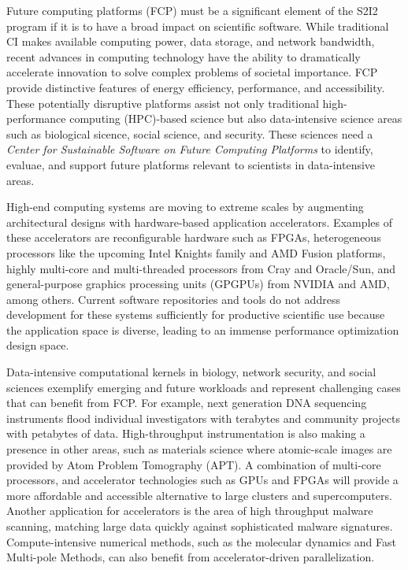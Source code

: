 Future computing platforms (FCP) must be a significant element of the S2I2 program if it is to have a broad impact on scientific software. 
While traditional CI makes available computing power, data storage, and network bandwidth, recent advances in computing technology have the ability to dramatically accelerate innovation to solve complex problems of societal importance. 
FCP provide distinctive features of energy efficiency, performance, and accessibility. 
These potentially disruptive platforms assist not only traditional high-performance computing (HPC)-based science but also data-intensive science areas such as biological sicence, 
social science, and security.  
These sciences need a \textit{Center for Sustainable Software on Future Computing Platforms} to identify, evaluae, and support future platforms relevant to scientists in data-intensive areas.

High-end computing systems are moving to extreme scales by augmenting architectural designs with hardware-based application accelerators. 
Examples of these accelerators are reconfigurable hardware such as FPGAs, heterogeneous processors like the upcoming Intel Knights family and AMD Fusion platforms, 
highly multi-core and multi-threaded processors from Cray and Oracle/Sun, and general-purpose graphics processing units (GPGPUs) from NVIDIA and AMD, among others. 
Current software repositories and tools do not address development for these systems sufficiently for productive scientific use because the application space is diverse, 
leading to an immense performance optimization design space.

Data-intensive computational kernels in biology, network security, and social sciences exemplify emerging and future workloads and represent challenging cases that can benefit from FCP. 
For example, next generation DNA sequencing instruments flood individual investigators with terabytes and community projects with petabytes of data. 
High-throughput instrumentation is also making a presence in other areas, such as materials science where atomic-scale images are provided by Atom Problem Tomography (APT). 
A combination of multi-core processors, and accelerator technologies such as GPUs and FPGAs will provide a more affordable and accessible alternative to large clusters and supercomputers. 
Another application for accelerators is the area of high throughput malware scanning, matching large data quickly against sophisticated malware signatures. 
Compute-intensive numerical methods, such as the molecular dynamics and Fast Multi-pole Methods, can also benefit from accelerator-driven parallelization.

